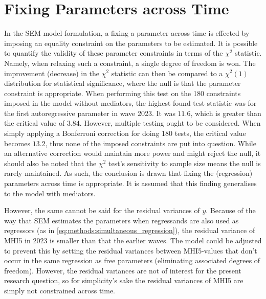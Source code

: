 \section{Fixing Parameters across Time}
\label{sec:modelling:parameter_fixing}
In the SEM model formulation, a fixing a parameter across time is effected by imposing an equality constraint on the
parameters to be estimated.
It is possible to quantify the validity of these parameter constraints in terms of the $\chi^2$ statistic.
Namely, when relaxing such a constraint, a single degree of freedom is won. The improvement (decrease) in the $\chi^2$
statistic can then be compared to a $\chi^2(1)$ distribution for statistical significance, where the null is
that the parameter constraint is appropriate.
When performing this test on the 180 constraints imposed in the model without mediators, the highest found test
statistic was for the first autoregressive parameter in wave 2023. It was $11.6$, which is greater than the critical
value of $3.84$. However, multiple testing ought to be considered.
When simply applying a Bonferroni correction for doing 180 tests, the critical value becomes $13.2$, thus none of the
imposed constraints are put into question.
While an alternative correction would maintain more power and might reject the null, it should also be noted that
the $\chi^2$ test's sensitivity to sample size means the null is rarely maintained. As such, the conclusion is drawn
that fixing the (regression) parameters across time is appropriate.
It is assumed that this finding generalises to the model with mediators.

However, the same cannot be said for the residual variances of $y$. Because of the way that SEM estimates the
parameters when regressands are also used as regressors (as in \cref{eq:methods:simultaneous_regression}),
the residual variance of MHI5 in 2023 is smaller than that the earlier waves. The model could be adjusted
to prevent this by setting the residual variances between MHI5-values that don't occur in the same regression as free
parameters (eliminating associated degrees of freedom). However, the residual variances are not of interest for the present
research question, so for simplicity's sake the residual variances of MHI5 are simply not constrained across time.
